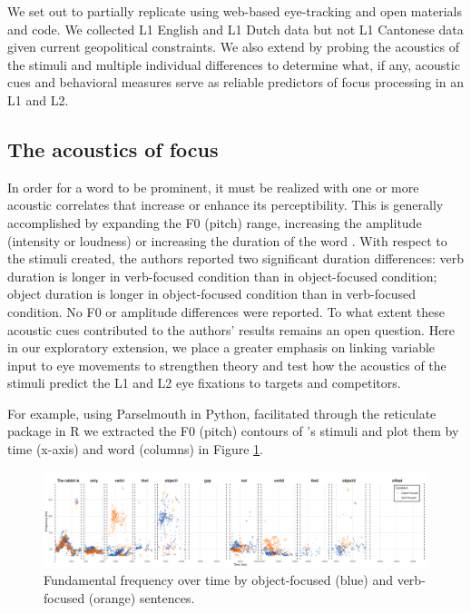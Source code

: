 We set out to partially replicate \cite{Ge2021} using web-based eye-tracking and open materials and code. We collected L1 English and L1 Dutch data but not L1 Cantonese data given current geopolitical constraints. We also extend \cite{Ge2021} by probing the acoustics of the stimuli and multiple individual differences to determine what, if any, acoustic cues and behavioral measures serve as reliable predictors of focus processing in an L1 and L2. 

\subsection{The acoustics of focus}
In order for a word to be prominent, it must be realized with one or more acoustic correlates that increase or enhance its perceptibility. This is generally accomplished by expanding the F0 (pitch) range, increasing the amplitude (intensity or loudness) or increasing the duration of the word \citep{Breen2010, Gussenhoven1983}. With respect to the stimuli \cite{Ge2021} created, the authors reported two significant duration differences: verb duration is longer in verb-focused condition than in object-focused condition; object duration is longer in object-focused condition than in verb-focused condition. No F0 or amplitude differences were reported. To what extent these acoustic cues contributed to the authors' results remains an open question. Here in our exploratory extension, we place a greater emphasis on linking variable input to eye movements to strengthen theory \citep{tanenhaus2000eye} and test how the acoustics of the stimuli predict the L1 and L2 eye fixations to targets and competitors.

For example, using Parselmouth \citep{jadoul2018introducing} in Python, facilitated through the reticulate package \citep{Ushey2022} in R we extracted the F0 (pitch) contours of \cite{Ge2021}'s stimuli and plot them by time (x-axis) and word (columns) in Figure \ref{fig:acoustic}.

\begin{figure}[H]  %
    \centering
    \includegraphics[width=\textwidth,height=\textheight,keepaspectratio]{viz/accoustic.png}
    \caption{Fundamental frequency over time by object-focused (blue) and verb-focused (orange) sentences.}
    \label{fig:acoustic}
\end{figure}

